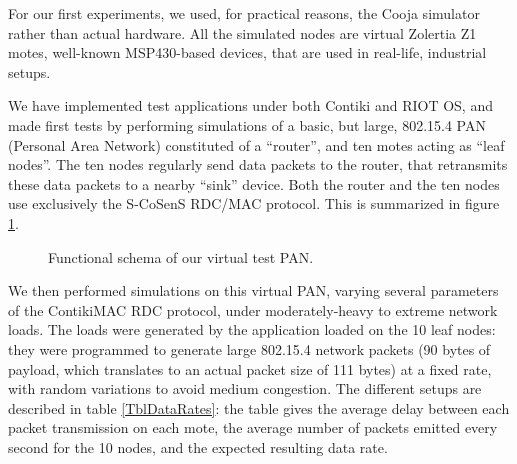 \documentclass[a4paper,twoside]{article}
\begin{document}
For our first experiments, we used, for practical reasons, the Cooja
simulator rather than actual hardware. All the simulated nodes are
virtual Zolertia Z1 motes, well-known MSP430-based devices, that are
used in real-life, industrial setups.

We have implemented test applications under both Contiki and RIOT OS, and
made first tests by performing simulations of a basic, but large, 802.15.4
PAN (Personal Area Network) constituted of a ``router'', and ten motes
acting as ``leaf nodes''. The ten nodes regularly send data packets to
the router, that retransmits these data packets to a nearby ``sink'' device.
Both the router and the ten nodes use exclusively the S-CoSenS RDC/MAC
protocol. This is summarized in figure \ref{FigPANtest}.

\begin{figure}[!h]
\centering
{}
\caption{Functional schema of our virtual test PAN.}
\label{FigPANtest}
\end{figure}

We then performed simulations on this virtual PAN, varying several parameters
of the ContikiMAC RDC protocol, under moderately-heavy to extreme network
loads. The loads were generated by the application loaded on the 10 leaf
nodes: they were programmed to generate large 802.15.4 network packets
(90 bytes of payload, which translates to an actual packet size of
111 bytes) at a fixed rate, with random variations to avoid
medium congestion. The different setups are described in table
\ref{TblDataRates}: the table gives the average delay between
each packet transmission on each mote, the average number of
packets emitted every second for the 10 nodes, and the expected
resulting data rate.
\end{document}
